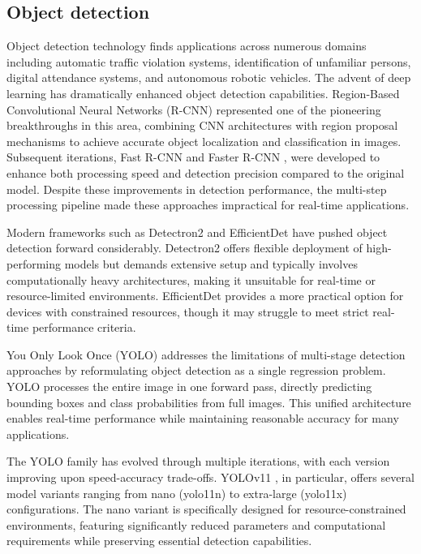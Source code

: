 \documentclass[../main.tex]{subfiles}
\begin{document}
\subsection{Object detection}
\label{sec:objdect}

Object detection technology finds applications across numerous domains including automatic traffic violation systems, identification of unfamiliar persons, digital attendance systems, and autonomous robotic vehicles. The advent of deep learning has dramatically enhanced object detection capabilities. Region-Based Convolutional Neural Networks (R-CNN) \cite{girshick2014richfeaturehierarchiesaccurate} represented one of the pioneering breakthroughs in this area, combining CNN architectures \cite{oshea2015introductionconvolutionalneuralnetworks} with region proposal mechanisms to achieve accurate object localization and classification in images. Subsequent iterations, Fast R-CNN \cite{girshick2015fastrcnn} and Faster R-CNN \cite{ren2016fasterrcnnrealtimeobject}, were developed to enhance both processing speed and detection precision compared to the original model. Despite these improvements in detection performance, the multi-step processing pipeline made these approaches impractical for real-time applications.

Modern frameworks such as Detectron2 \cite{Merz_2023} and EfficientDet \cite{tan2020efficientdetscalableefficientobject} have pushed object detection forward considerably. Detectron2 offers flexible deployment of high-performing models but demands extensive setup and typically involves \\computationally heavy architectures, making it unsuitable for real-time or resource-limited environments. EfficientDet provides a more practical option for devices with constrained resources, though it may struggle to meet strict real-time performance criteria.

You Only Look Once (YOLO) addresses the limitations of multi-stage detection approaches by reformulating object detection as a single regression problem. YOLO processes the entire image in one forward pass, directly predicting bounding boxes and class probabilities from full images. This unified architecture enables real-time performance while maintaining reasonable accuracy for many applications.

The YOLO family has evolved through multiple iterations, with each version improving upon speed-accuracy trade-offs. YOLOv11 \cite{khanam2024yolov11overviewkeyarchitectural}, in particular, offers several model variants ranging from nano (yolo11n) to extra-large (yolo11x)\\configurations. The nano variant is specifically designed for resource-constrained environments, featuring significantly reduced parameters and computational requirements while preserving essential detection capabilities.
\end{document}
